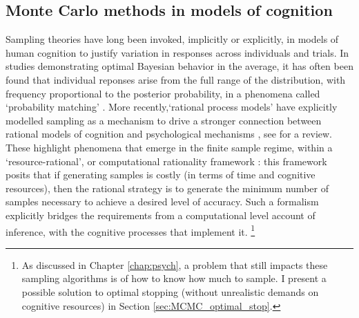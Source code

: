 \subsection{Monte Carlo methods in models of cognition}

Sampling theories have long been invoked, implicitly or explicitly, in models of human cognition to justify variation in responses across individuals and trials. In studies demonstrating optimal Bayesian behavior in the average, it has often been found that individual reponses arise from the full range of the distribution, with frequency proportional to the posterior probability, in a phenomena called `probability matching' \citep{wozny2010,Denison2013,Moreno11,Vul2014}. More recently,`rational process models' have explicitly modelled sampling as a mechanism to drive a stronger connection between rational models of cognition and psychological mechanisms \cite{griffiths2012bridging, Vul2014, shi10, sanborn2010rational, Lieder2013, nobandegani2019resource}, see \citet{sanborn2016bayesian} for a review. These highlight phenomena that emerge in the finite sample regime, within a `resource-rational', or computational rationality framework \citep{Vul2014,griffiths2015,Gershman2015,schulz2016simple}: this framework posits that if generating samples is costly (in terms of time and cognitive resources), then the rational strategy is to generate the minimum number of samples necessary to achieve a desired level of accuracy. Such a formalism explicitly bridges the requirements from a computational level account of inference, with the cognitive processes that implement it. \footnote{As discussed in Chapter \ref{chap:psych}, a problem that still impacts these sampling algorithms is of how to know how much to sample. I present a possible solution to optimal stopping (without unrealistic demands on cognitive resources) in Section \ref{sec:MCMC_optimal_stop}.}


